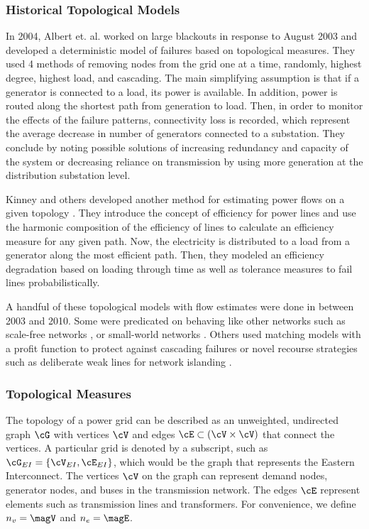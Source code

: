 \subsubsection{Historical Topological Models}
In 2004, Albert et. al. \cite{albert_2004} worked on large blackouts in response to August 2003 and developed a deterministic model of failures based on topological measures.  They used 4 methods of removing nodes from the grid one at a time, randomly, highest degree, highest load, and cascading.  The main simplifying assumption is that if a generator is connected to a load, its power is available.  In addition, power is routed along the shortest path from generation to load.  Then, in order to monitor the effects of the failure patterns, connectivity loss is recorded, which represent the average decrease in number of generators connected to a substation.  They conclude by noting possible solutions of increasing redundancy and capacity of the system or decreasing reliance on transmission by using more generation at the distribution substation level.

Kinney and others developed another method for estimating power flows on a given topology \cite{kinney_2005}.  They introduce the concept of efficiency for power lines and use the harmonic composition of the efficiency of lines to calculate an efficiency measure for any given path.  Now, the electricity is distributed to a load from a generator along the most efficient path.  Then, they modeled an efficiency degradation based on loading through time as well as tolerance measures to fail lines probabilistically.

A handful of these topological models with flow estimates were done in between 2003 and 2010.  Some were predicated on behaving like other networks such as scale-free networks \cite{zhao_2004}, \cite{wang_2009} or small-world networks \cite{ding_2006}.  Others used matching models with a profit function to protect against cascading failures \cite{sun_2008} or novel recourse strategies such as deliberate weak lines for network islanding \cite{duenas-osorio_2009}. 

\subsubsection{Topological Measures}

The topology of a power grid can be described as an unweighted, undirected graph $\cG$ with vertices $\cV$ and edges $\cE \subset (\cV \times \cV)$ that connect the vertices.  A particular grid is denoted by a subscript, such as $\cG_{EI} = \left\{ \cV_{EI}, \cE_{EI} \right\}$, which would be the graph that represents the Eastern Interconnect.  The vertices $\cV$ on the graph can represent demand nodes, generator nodes, and buses in the transmission network.  The edges $\cE$ represent elements such as transmission lines and transformers.  For convenience, we define $n_v = \magV$ and $n_e = \magE$.

